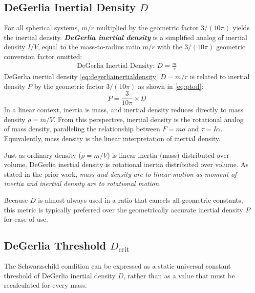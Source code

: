 \documentclass[twoside,twocolumn,9pt,fleqn]{article}
\begin{document}
\subsection{DeGerlia Inertial Density $D$}\label{sec:inertial_density}
For all spherical systems, $m/r$ multiplied by the geometric factor $3/(10\pi)$ yields the inertial density. \textbf{\textit{DeGerlia inertial density}} is a simplified analog of inertial density $I/V$, equal to the mass-to-radius ratio $m/r$ with the $3/(10\pi)$ geometric conversion factor omitted:
\begin{align}
\boxed{\text{DeGerlia Inertial Density: } D=\frac{m}{r} }
\label{eq:degerliainertialdensity}
\end{align}
DeGerlia inertial density \eqref{eq:degerliainertialdensity} $D = m/r$ is related to inertial density $P$ by the geometric factor $3/(10\pi)$ as shown in \eqref{eq:ptod}:
\begin{equation}
    P=\frac{3}{10\pi} \times D
\label{eq:ptod}
\end{equation}
In a linear context, inertia is mass, and inertial density reduces directly to mass density $\rho = m/V$. From this perspective, inertial density is the rotational analog of mass density, paralleling the relationship between $F = ma$ and $\tau = I\alpha$. Equivalently, mass density is the linear interpretation of inertial density.

Just as ordinary density ($\rho = m/V$) is linear inertia (mass) distributed over volume, DeGerlia inertial density is rotational inertia distributed over volume. As stated in the prior work, \textit{mass and density are to linear motion as moment of inertia and inertial density are to rotational motion.}

Because $D$ is almost always used in a ratio that cancels all geometric constants, this metric is typically preferred over the geometrically accurate inertial density $P$ for ease of use.

\subsection{DeGerlia Threshold $D_{\mathrm{crit}}$}
The Schwarzschild condition can be expressed as a static universal constant threshold of DeGerlia inertial density $D$, rather than as a value that must be recalculated for every mass.
\end{document}
